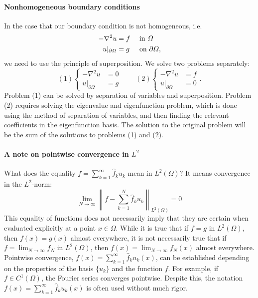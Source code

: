 \paragraph{Nonhomogeneous boundary conditions} In the case that our boundary condition is not homogeneous, i.e. 
\begin{equation}
    \begin{aligned}
        -\nabla^2 u&=f&&\text{ in }\Omega\\ 
        u|_{\partial\Omega}&=g&&\text{ on }\partial\Omega,
    \end{aligned}
\end{equation}
we need to use the principle of superposition. We solve two problems separately: 
\begin{equation*}
    (1)\left\{\begin{aligned}-\nabla^{2}u&=0\\ u|_{\partial\Omega}&=g\end{aligned}\right.\qquad (2)\left\{\begin{aligned}-\nabla^{2}u&=f\\ u|_{\partial\Omega}&=0\end{aligned}\right. .
\end{equation*}
Problem (1) can be solved by separation of variables and superposition. Problem (2) requires solving the eigenvalue and eigenfunction problem, which is done using the method of separation of variables, and then finding the relevant coefficients in the eigenfunction basis. The solution to the original problem will be the sum of the solutions to problems (1) and (2).

\paragraph{\texorpdfstring{A note on pointwise convergence in $L^2$}{A note on pointwise convergence in L2}} What does the equality $f=\sum_{k=1}^{\infty}\hat{f}_{k}u_{k}$ mean in $L^{2}(\Omega)$?  It means convergence in the $L^2$-norm:
\begin{equation*}
    \lim_{N\rightarrow\infty}\left\|f-\sum_{k=1}^{N}\hat{f}_{k}u_{k}\right\|_{L^{2}(\Omega)}=0
\end{equation*}
This equality of functions does not necessarily imply that they are certain when evaluated explicitly at a point $x\in\Omega$. While it is true that if $f=g$ in $L^{2}(\Omega)$, then $f(x)=g(x)$ almost everywhere, it is not necessarily true that if $f=\lim_{N\rightarrow\infty}f_{N}$ in $L^{2}(\Omega)$, then $f(x)=\lim_{N\rightarrow\infty}f_{N}(x)$ almost everywhere. Pointwise convergence, $f(x)=\sum_{k=1}^{\infty}\hat{f}_{k}u_{k}(x)$, can be established depending on the properties of the basis $\{u_k\}$ and the function $f$. For example, if $f\in C^{1}(\Omega)$, the Fourier series converges pointwise. Despite this, the notation $f(x)=\sum_{k=1}^{\infty}\hat{f}_{k}u_{k}(x)$ is often used without much rigor.

